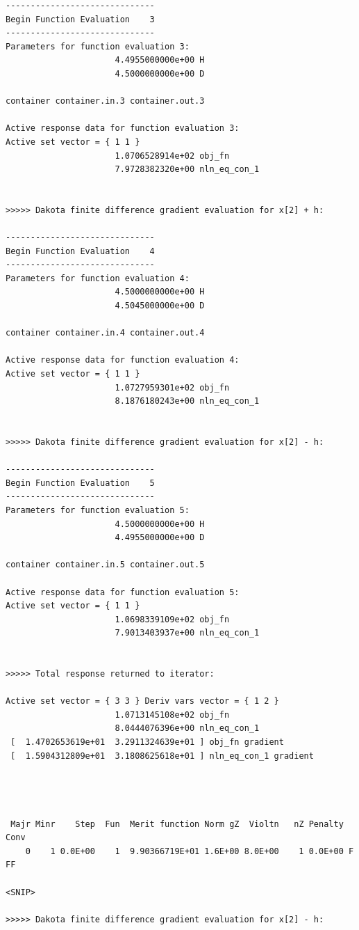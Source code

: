 \begin{small}
\begin{verbatim}
------------------------------
Begin Function Evaluation    3
------------------------------
Parameters for function evaluation 3:
                      4.4955000000e+00 H
                      4.5000000000e+00 D

container container.in.3 container.out.3

Active response data for function evaluation 3:
Active set vector = { 1 1 }
                      1.0706528914e+02 obj_fn
                      7.9728382320e+00 nln_eq_con_1


>>>>> Dakota finite difference gradient evaluation for x[2] + h:

------------------------------
Begin Function Evaluation    4
------------------------------
Parameters for function evaluation 4:
                      4.5000000000e+00 H
                      4.5045000000e+00 D

container container.in.4 container.out.4

Active response data for function evaluation 4:
Active set vector = { 1 1 }
                      1.0727959301e+02 obj_fn
                      8.1876180243e+00 nln_eq_con_1


>>>>> Dakota finite difference gradient evaluation for x[2] - h:

------------------------------
Begin Function Evaluation    5
------------------------------
Parameters for function evaluation 5:
                      4.5000000000e+00 H
                      4.4955000000e+00 D

container container.in.5 container.out.5

Active response data for function evaluation 5:
Active set vector = { 1 1 }
                      1.0698339109e+02 obj_fn
                      7.9013403937e+00 nln_eq_con_1


>>>>> Total response returned to iterator:

Active set vector = { 3 3 } Deriv vars vector = { 1 2 }
                      1.0713145108e+02 obj_fn
                      8.0444076396e+00 nln_eq_con_1
 [  1.4702653619e+01  3.2911324639e+01 ] obj_fn gradient
 [  1.5904312809e+01  3.1808625618e+01 ] nln_eq_con_1 gradient




 Majr Minr    Step  Fun  Merit function Norm gZ  Violtn   nZ Penalty Conv
    0    1 0.0E+00    1  9.90366719E+01 1.6E+00 8.0E+00    1 0.0E+00 F FF     

<SNIP>

>>>>> Dakota finite difference gradient evaluation for x[2] - h:


\end{verbatim}
\end{small}
